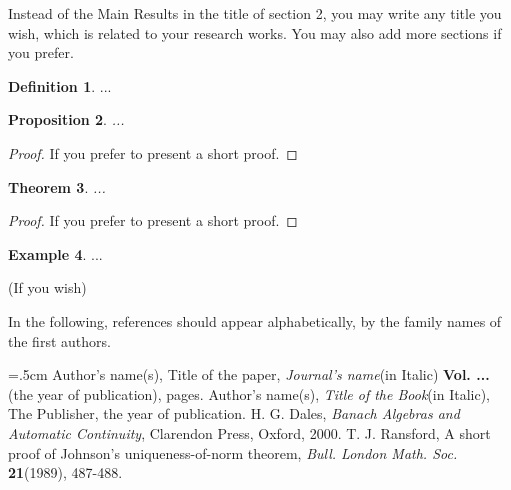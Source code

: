 \documentclass[a0,12pt,portrait]{a0poster}
\newtheorem{theorem}{Theorem}[section]
\newtheorem{proposition}[theorem]{Proposition}
\theoremstyle{definition}
\newtheorem{definition}[theorem]{Definition}
\newtheorem{example}[theorem]{Example}
\numberwithin{equation}{section}
\begin{document}
\begin{multicols}{2}
\noindent Instead of the Main Results in the title of section 2, you may write any title you wish, which is related to
your research works. You may also add more sections if you prefer.
\begin{definition}
...
\end{definition}
\begin{proposition}
...
\end{proposition}
\begin{proof}
If you prefer to present a short proof.
\end{proof}
\begin{theorem}
...
\end{theorem}
\begin{proof}
If you prefer to present a short proof.
\end{proof}
\begin{example}
...
\end{example}
 (If you wish)

\noindent  In the following, references should  appear alphabetically, by the
family names of the first authors.

\begin{thebibliography}{99}
\baselineskip=.5cm
 Author's name(s), Title of the paper, \textit{Journal's name}(in Italic)  {\bf Vol. ...} (the year of publication), pages.
Author's name(s), \textit{Title of the Book}(in Italic), The
Publisher, the year of publication.
 H. G. Dales, \textit{Banach Algebras and Automatic Continuity}, Clarendon Press, Oxford, 2000.
 T. J. Ransford, A short proof of Johnson's uniqueness-of-norm theorem, \textit{ Bull. London Math. Soc.} {\bf 21}(1989), 487-488.
\end{thebibliography}

\end{multicols}
\end{document}
